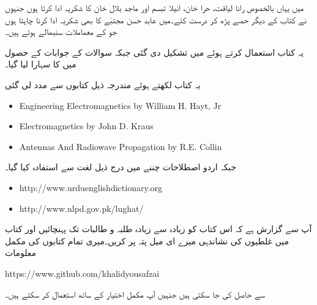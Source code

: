 میں یہاں بالخصوص رانا لیاقت، حرا خان، انیلا تبسم اور ماجد بلال خان کا شکریہ ادا کرتا ہوں جنہوں نے کتاب کے دیگر حصے پڑھ کر درست کئے۔میں عابد حسن مجتبٰے کا بھی شکریہ ادا کرنا چاہتا ہوں جو  کے معماملات سنبھالے ہوئے ہیں۔

یہ کتاب  استعمال کرتے ہوئے  میں تشکیل دی گئی جبکہ سوالات کے جوابات کے حصول میں  کا سہارا لیا گیا۔

یہ کتاب لکھتے ہوئے مندرجہ ذیل کتابوں سے مدد لی گئی
{
\begin{otherlanguage}{english}
\begin{itemize}
\item
Engineering Electromagnetics by William H. Hayt, Jr
\item
Electromagnetics by John D. Kraus
\item
Antennas And Radiowave Propagation by R.E. Collin
\end{itemize}
\end{otherlanguage}
}
جبکہ اردو اصطلاحات چننے میں درج ذیل لغت سے استفادہ  کیا گیا۔
{
\begin{otherlanguage}{english}
\begin{itemize}
\item
http:/\!\!/www.urduenglishdictionary.org
\item
http:/\!\!/www.nlpd.gov.pk/lughat/
\end{itemize}
\end{otherlanguage}
}
آپ سے گزارش ہے کہ اس کتاب کو زیادہ سے زیادہ طلبہ و طالبات تک پہنچائیں اور کتاب میں غلطیوں کی نشاندہی میرے  ای میل پتہ پر کریں۔میری تمام کتابوں کی مکمل  معلومات

{
\begin{otherlanguage}{english}
https:/\!\!/www.github.com/khalidyousafzai
\end{otherlanguage}
}

سے حاصل کی جا سکتی ہیں جنہیں آپ مکمل اختیار کے ساتھ استعمال کر سکتے ہیں۔
\vspace{5mm}

{}


